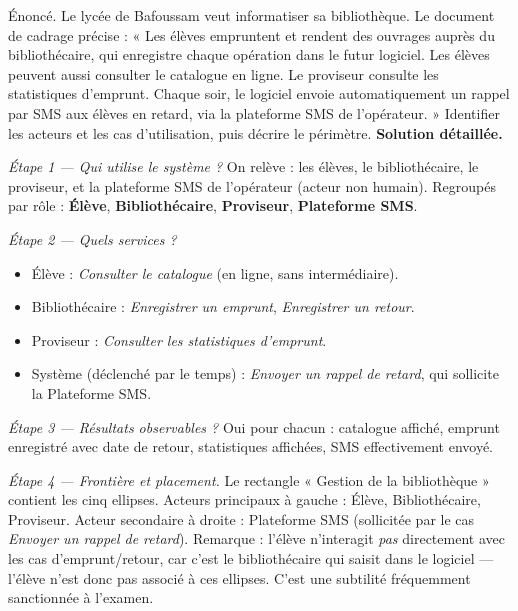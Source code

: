 \documentclass[11pt]{article}
\begin{document}
\begin{exoresolu}
Énoncé. Le lycée de Bafoussam veut informatiser sa bibliothèque. Le document de cadrage précise : « Les élèves empruntent et rendent des ouvrages auprès du bibliothécaire, qui enregistre chaque opération dans le futur logiciel. Les élèves peuvent aussi consulter le catalogue en ligne. Le proviseur consulte les statistiques d'emprunt. Chaque soir, le logiciel envoie automatiquement un rappel par SMS aux élèves en retard, via la plateforme SMS de l'opérateur. » Identifier les acteurs et les cas d'utilisation, puis décrire le périmètre.
\tcblower
\textbf{Solution détaillée.}

\emph{Étape 1 — Qui utilise le système ?} On relève : les élèves, le bibliothécaire, le proviseur, et la plateforme SMS de l'opérateur (acteur non humain). Regroupés par rôle : \textbf{Élève}, \textbf{Bibliothécaire}, \textbf{Proviseur}, \textbf{Plateforme SMS}.

\emph{Étape 2 — Quels services ?}
\begin{itemize}
\item Élève : \emph{Consulter le catalogue} (en ligne, sans intermédiaire).
\item Bibliothécaire : \emph{Enregistrer un emprunt}, \emph{Enregistrer un retour}.
\item Proviseur : \emph{Consulter les statistiques d'emprunt}.
\item Système (déclenché par le temps) : \emph{Envoyer un rappel de retard}, qui sollicite la Plateforme SMS.
\end{itemize}

\emph{Étape 3 — Résultats observables ?} Oui pour chacun : catalogue affiché, emprunt enregistré avec date de retour, statistiques affichées, SMS effectivement envoyé.

\emph{Étape 4 — Frontière et placement.} Le rectangle « Gestion de la bibliothèque » contient les cinq ellipses. Acteurs principaux à gauche : Élève, Bibliothécaire, Proviseur. Acteur secondaire à droite : Plateforme SMS (sollicitée par le cas \emph{Envoyer un rappel de retard}). Remarque : l'élève n'interagit \emph{pas} directement avec les cas d'emprunt/retour, car c'est le bibliothécaire qui saisit dans le logiciel — l'élève n'est donc pas associé à ces ellipses. C'est une subtilité fréquemment sanctionnée à l'examen.
\end{exoresolu}
\end{document}
